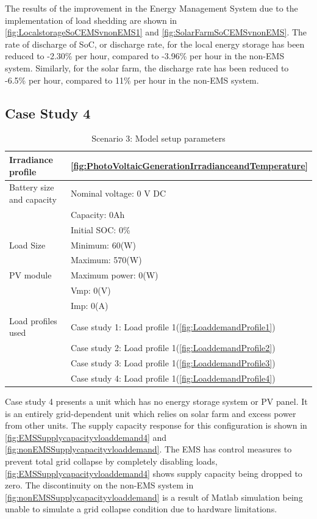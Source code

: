 The results of the improvement in the Energy Management System due to the implementation of load shedding are shown in \autoref{fig:LocalstorageSoCEMSvnonEMS1} and \autoref{fig:SolarFarmSoCEMSvnonEMS}. The rate of discharge of SoC, or discharge rate, for the local energy storage has been reduced to -2.30\% per hour, compared to -3.96\% per hour in the non-EMS system. Similarly, for the solar farm, the discharge rate has been reduced to -6.5\% per hour, compared to 11\% per hour in the non-EMS system.

\subsection{Case Study 4}
\begin{table}[!ht]
	\begin{center}
		\caption{Scenario 3: Model setup parameters}
		\begin{tabular}{|p{6cm}|p{8cm}|} %
			\hline
			\textbf{Irradiance profile } & \textbf{\autoref{fig:PhotoVoltaicGenerationIrradianceandTemperature}}\\
			\hline
			Battery size and capacity	& Nominal voltage: 0 V DC \\
			& Capacity: 0Ah\\
			& Initial SOC: 0\% \\
			\hline
			Load Size 					& Minimum: 60(W)\\
			& Maximum: 570(W)\\
			\hline
			PV module		 			& Maximum power: 0(W)\\
			& Vmp: 0(V)\\
			& Imp: 0(A)\\
			\hline
			Load profiles used & Case study 1: Load profile 1(\autoref{fig:LoaddemandProfile1})\\
				 			   & Case study 2: Load profile 1(\autoref{fig:LoaddemandProfile2})\\
				 			   & Case study 3: Load profile 1(\autoref{fig:LoaddemandProfile3})\\
				 			   & Case study 4: Load profile 1(\autoref{fig:LoaddemandProfile4})\\
			\hline
		\end{tabular}
	\end{center}
\end{table}

Case study 4 presents a unit which has no energy storage system or PV panel. It is an entirely grid-dependent unit which relies on solar farm and excess power from other units. The supply capacity response for this configuration is shown in \autoref{fig:EMSSupplycapacityvloaddemand4} and \autoref{fig:nonEMSSupplycapacityvloaddemand}. The EMS has control measures to prevent total grid collapse by completely disabling loads, \autoref{fig:EMSSupplycapacityvloaddemand4} shows supply capacity being dropped to zero. The discontinuity on the non-EMS system in \autoref{fig:nonEMSSupplycapacityvloaddemand} is a result of Matlab simulation being unable to simulate a grid collapse condition due to hardware limitations.


